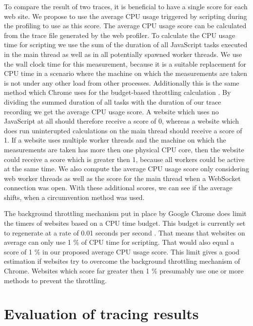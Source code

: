 \documentclass[
	ngerman,
	ruledheaders=section,%
	class=report,%
	thesis={type=bachelor},%
	accentcolor=9c,%
	custommargins=true,%
	marginpar=false,%
	parskip=half-,%
	fontsize=11pt,%
]{tudapub}
\begin{document}
  To compare the result of two traces, it is beneficial to have a single score for each web site. We propose to use the average CPU usage triggered by scripting during the profiling to use as this score. The average CPU usage score can be calculated from the trace file generated by the web profiler. To calculate the CPU usage time for scripting we use the sum of the duration of all JavaScript tasks executed in the main thread as well as in all potentially spawned worker threads. We use the wall clock time for this measurement, because it is a suitable replacement for CPU time in a scenario where the machine on which the measurements are taken is not under any other load from other processes. Additionally this is the same method which Chrome uses for the budget-based throttling calculation \cite{chrome-background-tabs}. By dividing the summed duration of all tasks with the duration of our trace recording we get the average CPU usage score. A website which uses no JavaScript at all should therefore receive a score of 0, whereas a website which does run uninterupted calculations on the main thread should receive a score of 1. If a website uses multiple worker threads and the machine on which the measurements are taken has more then one physical CPU core, then the website could receive a score which is greater then 1, because all workers could be active at the same time. We also compute the average CPU usage score only considering web worker threads as well as the score for the main thread when a WebSocket connection was open. With these additional scores, we can see if the average shifts, when a circumvention method was used.

  The background throttling mechanism put in place by Google Chrome does limit the timers of websites based on a CPU time budget. This budget is currently set to regenerate at a rate of 0.01 seconds per second \cite{chrome-background-tabs}. That means that websites on average can only use 1 \% of CPU time for scripting. That would also equal a score of 1 \% in our proposed average CPU usage score. This limit gives a good estimation if websites try to overcome the background throttling mechanism of Chrome. Websites which score far greater then 1 \% presumably use one or more methods to prevent the throttling.

  
  \section{Evaluation of tracing results}
\end{document}
